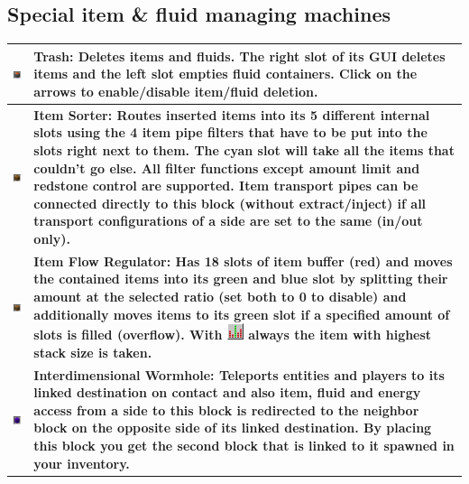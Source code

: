 \documentclass[11pt]{article} %
\makeatletter
\newcommand{\imgtex}{\begin{tabularx}{\textwidth}{@{}c@{ }X@{}}}
\makeatother
\begin{document}
\subsection{Special item \& fluid managing machines}
\imgtex \hline
\includegraphics[align = t]{blockTrash} & \bf Trash: \rm Deletes items and fluids. The right slot of its GUI deletes items and the left slot empties fluid containers. Click on the arrows to enable/disable item/fluid deletion. \\ \hline
\includegraphics[align = t]{blockSorter} & \bf Item Sorter: \rm Routes inserted items into its 5 different internal slots using the 4 item pipe filters that have to be put into the slots right next to them. The cyan slot will take all the items that couldn't go else. All filter functions except amount limit and redstone control are supported. \bf Item transport pipes \rm can be connected directly to this block (without extract/inject) if all transport configurations of a side are set to the same (in/out only).\\ \hline
\includegraphics[align = t]{blockRegulator} & \bf Item Flow Regulator: \rm Has 18 slots of item buffer (red) and moves the contained items into its green and blue slot by splitting their amount at the selected ratio (set both to 0 to disable) and additionally moves items to its green slot if a specified amount of slots is filled (overflow). With \includegraphics[align = c]{bigStackFirst} always the item with highest stack size is taken. \\ \hline
\includegraphics[align = t]{blockInterdim} & \bf Interdimensional Wormhole: \rm Teleports entities and players to its linked destination on contact and also item, fluid and energy access from a side to this block is redirected to the neighbor block on the opposite side of its linked destination. By placing this block you get the second block that is linked to it spawned in your inventory. \\ \hline
\end{tabularx}
\end{document}
